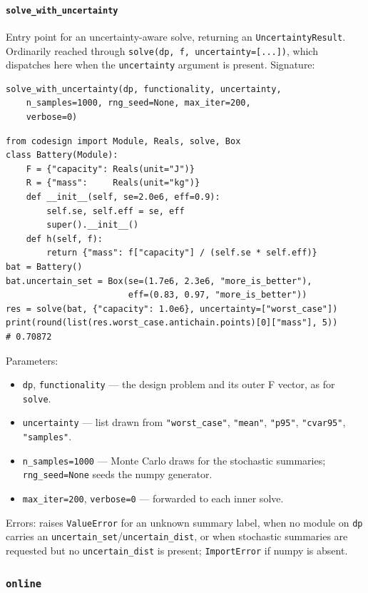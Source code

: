 \documentclass[11pt,a4paper]{article}
\begin{document}
\paragraph{\texttt{solve\_with\_uncertainty}}%
\label{ref:uncertainty:solve_with_uncertainty}
Entry point for an uncertainty-aware solve, returning an
\texttt{UncertaintyResult}. Ordinarily reached through
\texttt{solve(dp, f, uncertainty=[...])}, which dispatches here when the
\texttt{uncertainty} argument is present. Signature:
\begin{lstlisting}
solve_with_uncertainty(dp, functionality, uncertainty,
    n_samples=1000, rng_seed=None, max_iter=200,
    verbose=0)
\end{lstlisting}
\begin{lstlisting}
from codesign import Module, Reals, solve, Box
class Battery(Module):
    F = {"capacity": Reals(unit="J")}
    R = {"mass":     Reals(unit="kg")}
    def __init__(self, se=2.0e6, eff=0.9):
        self.se, self.eff = se, eff
        super().__init__()
    def h(self, f):
        return {"mass": f["capacity"] / (self.se * self.eff)}
bat = Battery()
bat.uncertain_set = Box(se=(1.7e6, 2.3e6, "more_is_better"),
                        eff=(0.83, 0.97, "more_is_better"))
res = solve(bat, {"capacity": 1.0e6}, uncertainty=["worst_case"])
print(round(list(res.worst_case.antichain.points)[0]["mass"], 5))
# 0.70872
\end{lstlisting}
Parameters:
\begin{itemize}[nosep]
  \item \texttt{dp}, \texttt{functionality} --- the design problem and its
    outer F vector, as for \texttt{solve}.
  \item \texttt{uncertainty} --- list drawn from \texttt{"worst\_case"},
    \texttt{"mean"}, \texttt{"p95"}, \texttt{"cvar95"}, \texttt{"samples"}.
  \item \texttt{n\_samples=1000} --- Monte Carlo draws for the stochastic
    summaries; \texttt{rng\_seed=None} seeds the numpy generator.
  \item \texttt{max\_iter=200}, \texttt{verbose=0} --- forwarded to each
    inner solve.
\end{itemize}
Errors: raises \texttt{ValueError} for an unknown summary label, when no
module on \texttt{dp} carries an \texttt{uncertain\_set}/\texttt{uncertain\_dist},
or when stochastic summaries are requested but no \texttt{uncertain\_dist} is
present; \texttt{ImportError} if numpy is absent.

\subsubsection{\texttt{online}}
\label{ref:online}
\end{document}
